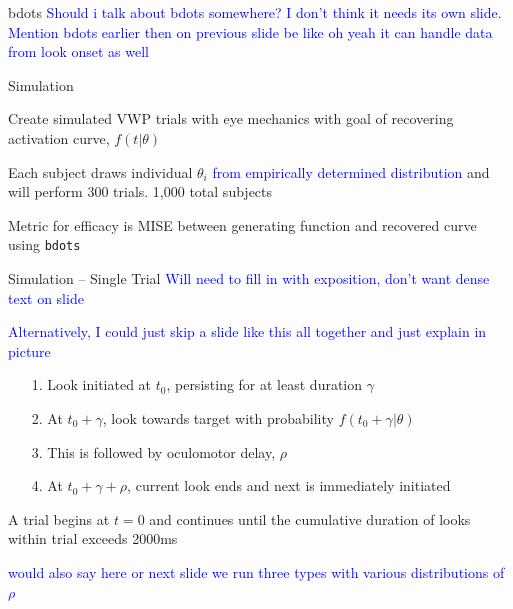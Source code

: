 \documentclass{beamer}
\newcommand{\vp}{\vspace{2mm}}
\newcommand{\xt}{\texttt}
\providecommand{\cn}[1]{\textcolor{blue}{#1}}
\begin{document}
\begin{frame}{bdots}
\cn{Should i talk about bdots somewhere? I don't think it needs its own slide. Mention bdots earlier then on previous slide be like oh yeah it can handle data from look onset as well}
\end{frame}

\begin{frame}{Simulation}

Create simulated VWP trials with eye mechanics with goal of recovering activation curve, $f(t|\theta)$ \vp

Each subject draws individual $\theta_i$ \cn{from empirically determined distribution} and will perform 300 trials. 1,000 total subjects


Metric for efficacy is MISE between generating function and recovered curve using \xt{bdots}
\end{frame}


\begin{frame}{Simulation -- Single Trial}\large
\cn{Will need to fill in with exposition, don't want dense text on slide}

\cn{Alternatively, I could just skip a slide like this all together and just explain in picture}

\begin{enumerate}
\item[1.] Look initiated at $t_0$, persisting for at least duration $\gamma$
\item[2.] At $t_0 + \gamma$, look towards target with probability $f(t_0 + \gamma|\theta)$
\item[3.] This is followed by oculomotor delay, $\rho$
\item[4.] At $t_0 + \gamma + \rho$, current look ends and next is immediately initiated
\end{enumerate}

\vspace{5mm}

A trial begins at $t = 0$ and continues until the cumulative duration of looks within trial exceeds 2000ms

\cn{would also say here or next slide we run three types with various distributions of $\rho$}

\end{frame}
\end{document}
